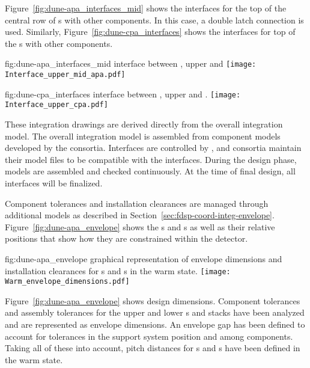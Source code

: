 Figure~\ref{fig:dune-apa_interfaces_mid} shows the interfaces for the
top of the central row of s with other components. In this case, a
double latch connection is used. Similarly,
Figure~\ref{fig:dune-cpa_interfaces} shows the interfaces for top of the
s with other components.
\begin{dunefigure}{fig:dune-apa_interfaces_mid}
  { interface between , upper  and }
  \texttt{[image: Interface\_upper\_mid\_apa.pdf]}
\end{dunefigure}
\begin{dunefigure}
    {fig:dune-cpa_interfaces}
  { interface between , upper  and .}
  \texttt{[image: Interface\_upper\_cpa.pdf]}
\end{dunefigure}

These integration drawings are derived directly from the overall
integration model. The overall integration model is assembled from
component models developed by the consortia. Interfaces are controlled
by , and consortia maintain their model files to be
compatible with the interfaces. During the design phase, models are
assembled and checked continuously. At the time of final design, all
interfaces will be finalized. 


Component tolerances and installation clearances are managed through
additional models as described in
Section~\ref{sec:fdsp-coord-integ-envelope}.
Figure~\ref{fig:dune-apa_envelope} shows the s and
s as well as their relative positions that show how they are
constrained within the detector.
\begin{dunefigure}
    {fig:dune-apa_envelope} { graphical
    representation of envelope dimensions and installation clearances
    for s and s in the warm state.}
  \texttt{[image: Warm\_envelope\_dimensions.pdf]}
\end{dunefigure}



Figure~\ref{fig:dune-apa_envelope} shows design dimensions. Component tolerances and assembly
tolerances for the upper and lower s and  stacks
have been analyzed and are represented as envelope dimensions. An envelope
gap has been defined to account for tolerances in the support system
position and among components. Taking all of these into account, pitch
distances for s and s have been defined in the
warm state.

